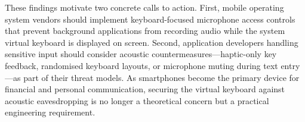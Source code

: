 \documentclass[conference]{IEEEtran}
\begin{document}
These findings motivate two concrete calls to action.
First, mobile operating system vendors should implement
keyboard-focused microphone access controls that prevent
background applications from recording audio while the system
virtual keyboard is displayed on screen.
Second, application developers handling sensitive input should
consider acoustic countermeasures---haptic-only key feedback,
randomised keyboard layouts, or microphone muting during
text entry---as part of their threat models.
As smartphones become the primary device for financial and
personal communication, securing the virtual keyboard against
acoustic eavesdropping is no longer a theoretical concern
but a practical engineering requirement.
 


\end{document}
